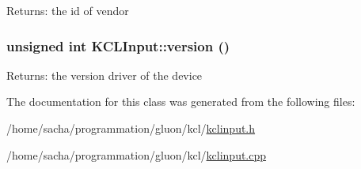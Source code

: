 \begin{Desc}
\item[Returns:]the id of vendor \end{Desc}
\hypertarget{class_k_c_l_input_53ebfb56b5039bdeb8b6bed4bbff1b0e}{
\subsubsection[{version}]{\setlength{\rightskip}{0pt plus 5cm}unsigned int KCLInput::version ()}}
\label{class_k_c_l_input_53ebfb56b5039bdeb8b6bed4bbff1b0e}


\begin{Desc}
\item[Returns:]the version driver of the device \end{Desc}


The documentation for this class was generated from the following files:\begin{CompactItemize}
\item 
/home/sacha/programmation/gluon/kcl/\hyperlink{kclinput_8h}{kclinput.h}\item 
/home/sacha/programmation/gluon/kcl/\hyperlink{kclinput_8cpp}{kclinput.cpp}\end{CompactItemize}
